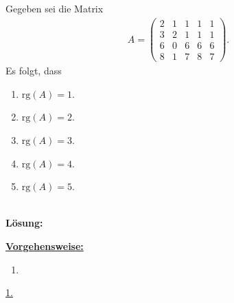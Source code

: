 \subsection*{}
Gegeben sei die Matrix
\begin{align*}
	A =
	\begin{pmatrix}
		2 & 1 & 1 & 1 & 1 \\
		3 & 2 & 1 & 1 & 1 \\
		6 & 0 & 6 & 6 & 6 \\ 
		8 & 1 & 7 & 8 & 7
	\end{pmatrix}.
\end{align*}
Es folgt, dass
\renewcommand{\labelenumi}{(\alph{enumi})}
\begin{enumerate}
	\item 
	$ \mathrm{rg}(A) = 1 $.
	\item 
	$ \mathrm{rg}(A) = 2 $.
	\item
	$ \mathrm{rg}(A) = 3 $.
	\item
	$ \mathrm{rg}(A) = 4 $.
	\item
	$ \mathrm{rg}(A) = 5 $.
\end{enumerate}
\ \\
\textbf{Lösung:}
\begin{mdframed}
\underline{\textbf{Vorgehensweise:}}
\renewcommand{\labelenumi}{\theenumi.}
\begin{enumerate}
\item 
\end{enumerate}
\end{mdframed}

\underline{1. }\\

\newpage

